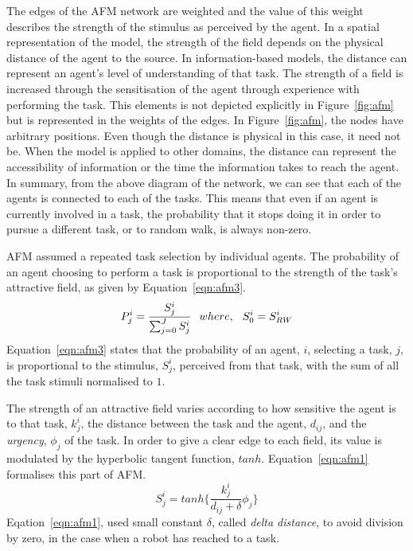 \documentclass[smallcondensed]{svjour3}
\begin{document}
The edges of the AFM network are weighted and the value of this weight describes the strength of the stimulus as perceived by the agent.  In a spatial representation of the model, the strength of the field depends on the physical distance of the agent to the source.  In information-based models, the distance can represent an agent's level of understanding of that task.  The strength of a field is increased through the sensitisation of the agent through experience with performing the task.  This elements is not depicted explicitly in Figure~\ref{fig:afm} but is represented in the weights of the edges.  In Figure~\ref{fig:afm}, the nodes have arbitrary positions.  Even though the distance is physical in this case, it need not be.  When the model is applied to other domains, the distance can represent the accessibility of information or the time the information takes to reach the agent. 
In summary, from the above diagram of the network, we can see that each of the agents is connected to each of the tasks. This means that even if an agent is currently involved in a task, the probability that it stops doing it in order to pursue a different task, or to random walk, is always non-zero.

AFM assumed a repeated task selection by individual agents.  The probability of an agent choosing to perform a task is proportional to the strength of the task's attractive field, as given by Equation~\ref{eqn:afm3}.
\begin{equation}
P_{j}^{i} = \frac{S_{j}^{i}}{\sum_{j=0}^{J} S_{j}^{i}} \hspace*{0.25cm}where,\hspace*{0.25cm}S^{i}_{0} = S^{i}_{RW}   
\label{eqn:afm3}
\end{equation}
Equation~\ref{eqn:afm3} states that the probability of an agent, $i$, selecting a task, $j$, is proportional to the stimulus, $ S^i_j$, perceived from that task, with the sum of all the task stimuli normalised to $1$.

The strength of an attractive field varies according to how sensitive the agent is to that task, $k_{j}^{i}$, the distance between the task and the agent, $d_{ij}$, and the {\em urgency}, $\phi _{j}$ of the task.  In order to give a clear edge to each field, its value is modulated by the hyperbolic tangent function, $tanh$.  Equation~\ref{eqn:afm1} formalises this part of AFM.
\begin{equation}
S_{j}^{i} = tanh\{\frac{k_{j}^{i}}{d_{ij}+\delta } \phi _{j}\}
\label{eqn:afm1}
\end{equation}
Eqation~\ref{eqn:afm1}, used small constant $\delta$, called {\em delta distance}, to avoid division by zero, in the case when a robot has reached to a task.
\end{document}
